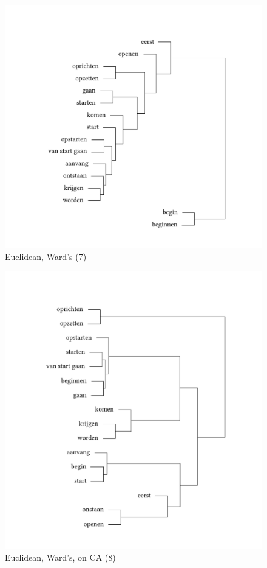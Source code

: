 \begin{figure}
\includegraphics[height=.4\textheight]{figures/tree36.pdf}
\caption{\label{fig:3:36}  Euclidean, Ward’s (7)}
\end{figure}

\begin{figure}
\includegraphics[height=.4\textheight]{figures/tree37.pdf}
\caption{\label{fig:3:37}  Euclidean, Ward’s, on CA (8)}
\end{figure}

